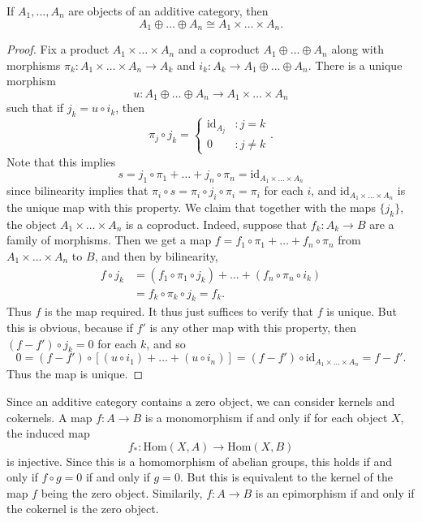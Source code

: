 \begin{lemma}
    If $A_1, \dots, A_n$ are objects of an additive category, then
    \[ A_1 \oplus \dots \oplus A_n \cong A_1 \times \dots \times A_n. \]
\end{lemma}
\begin{proof}
    Fix a product $A_1 \times \dots \times A_n$ and a coproduct $A_1 \oplus \dots \oplus A_n$ along with morphisms $\pi_k: A_1 \times \dots \times A_n \to A_k$ and $i_k: A_k \to A_1 \oplus \dots \oplus A_n$. There is a unique morphism
    \[ u: A_1 \oplus \dots \oplus A_n \to A_1 \times \dots \times A_n \]
    such that if $j_k = u \circ i_k$, then
    \[ \pi_j \circ j_k = \begin{cases} \text{id}_{A_j} &: j = k \\ 0 &: j \neq k \end{cases}. \]
    Note that this implies
    \[ s = j_1 \circ \pi_1 + \dots + j_n \circ \pi_n = \text{id}_{A_1 \times \dots \times A_n} \]
    since bilinearity implies that $\pi_i \circ s = \pi_i \circ j_i \circ \pi_i = \pi_i$ for each $i$, and $\text{id}_{A_1 \times \dots \times A_n}$ is the unique map with this property. We claim that together with the maps $\{ j_k \}$, the object $A_1 \times \dots \times A_n$ is a coproduct. Indeed, suppose that $f_k: A_k \to B$ are a family of morphisms. Then we get a map $f = f_1 \circ \pi_1 + \dots + f_n \circ \pi_n$ from $A_1 \times \dots \times A_n$ to $B$, and then by bilinearity,
    \begin{align*}
        f \circ j_k &= (f_1 \circ \pi_1 \circ j_k) + \dots + (f_n \circ \pi_n \circ i_k)\\
        &= f_k \circ \pi_k \circ j_k = f_k.
    \end{align*}
    Thus $f$ is the map required. It thus just suffices to verify that $f$ is unique. But this is obvious, because if $f'$ is any other map with this property, then $(f - f') \circ j_k = 0$ for each $k$, and so
    \[ 0 = (f - f') \circ [(u \circ i_1) + \dots + (u \circ i_n)] = (f - f') \circ \text{id}_{A_1 \times \dots \times A_n} = f - f'. \]
    Thus the map is unique.
\end{proof}

Since an additive category contains a zero object, we can consider kernels and cokernels. A map $f: A \to B$ is a monomorphism if and only if for each object $X$, the induced map
%
\[ f_*: \text{Hom}(X,A) \to \text{Hom}(X,B) \]
%
is injective. Since this is a homomorphism of abelian groups, this holds if and only if $f \circ g = 0$ if and only if $g = 0$. But this is equivalent to the kernel of the map $f$ being the zero object. Similarily, $f: A \to B$ is an epimorphism if and only if the cokernel is the zero object.

